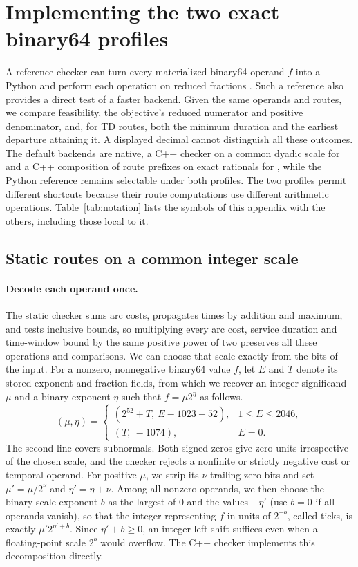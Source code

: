 \section{Implementing the two exact binary64 profiles}\label{app:implementation-guide}

A reference checker can turn every materialized binary64 operand $f$ into a Python  and perform each operation on reduced fractions \autocite{pythonFractions2026}. Such a reference also provides a direct test of a faster backend. Given the same operands and routes, we compare feasibility, the objective's reduced numerator and positive denominator, and, for TD routes, both the minimum duration and the earliest departure attaining it. A displayed decimal cannot distinguish all these outcomes. The default backends are native, a C++ checker on a common dyadic scale for  and a C++ composition of route prefixes on exact rationals for , while the Python  reference remains selectable under both profiles. The two profiles permit different shortcuts because their route computations use different arithmetic operations. Table~\ref{tab:notation} lists the symbols of this appendix with the others, including those local to it.

\subsection{Static routes on a common integer scale}\label{app:static-integers}

\paragraph{Decode each operand once.}
The static checker sums arc costs, propagates times by addition and maximum, and tests inclusive bounds, so multiplying every arc cost, service duration and time-window bound by the same positive power of two preserves all these operations and comparisons. We can choose that scale exactly from the bits of the input. For a nonzero, nonnegative binary64 value $f$, let $E$ and $T$ denote its stored exponent and fraction fields, from which we recover an integer significand $\mu$ and a binary exponent $\eta$ such that $f=\mu2^{\eta}$ as follows.
\[
 (\mu,\eta)=
 \begin{cases}
 (2^{52}+T,\ E-1023-52), & 1\leq E\leq 2046,\\
 (T,\ -1074), & E=0.
 \end{cases}
\]
The second line covers subnormals. Both signed zeros give zero units irrespective of the chosen scale, and the checker rejects a nonfinite or strictly negative cost or temporal operand. For positive $\mu$, we strip its $\nu$ trailing zero bits and set $\mu'=\mu/2^{\nu}$ and $\eta'=\eta+\nu$. Among all nonzero operands, we then choose the binary-scale exponent $b$ as the largest of $0$ and the values $-\eta'$ (use $b=0$ if all operands vanish), so that the integer representing $f$ in units of $2^{-b}$, called ticks, is exactly $\mu'2^{\eta'+b}$. Since $\eta'+b\geq0$, an integer left shift suffices even when a floating-point scale $2^b$ would overflow. The C++ checker implements this decomposition directly.


